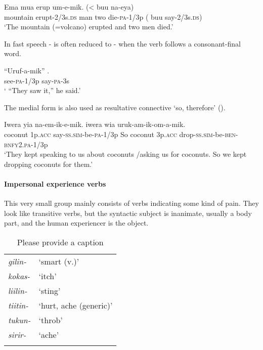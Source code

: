 \ea%
\label{ex:3:x332}
\gll Ema  mua erup um-e-mik. ({{\textless}} buu na-eya) \\
mountain erupt-2/3s.\textsc{ds} man two die-\textsc{pa}-1/3p ( buu say-2/3s.\textsc{ds})\\
\glt`The mountain (=volcano) erupted and two men died.'
\z

In fast speech - is often reduced to - when the verb follows a consonant-final word.

\ea%
\label{ex:3:x333}
\gll ``Uruf-a-mik'' . \\
see-\textsc{pa}-1/3p say-\textsc{pa}-3s \\
\glt` ``They saw it,'' he said.'
\z

The medial form  is also used as resultative connective `so, therefore' ().

\ea%
\label{ex:3:x500}
\gll Iwera yia na-em-ik-e-mik.  iwera wia uruk-am-ik-om-a-mik. \\
coconut 1p.\textsc{acc} say-\textsc{ss}.\textsc{sim}-be-\textsc{pa}-1/3p So coconut 3p.\textsc{acc} drop-\textsc{ss}.\textsc{sim}-be-\textsc{ben}-\textsc{bnfy}2.\textsc{pa}-1/3p\\
\glt`They kept speaking to us about coconuts /asking us for coconuts. So we kept dropping coconuts for them.'
\z

\paragraph{Impersonal experience verbs}\label{sec:3.8.4.4.7}
{}
This very small group mainly consists of verbs indicating some kind of pain. They look like transitive verbs, but the syntactic subject is inanimate, usually a body part, and the human experiencer is the object. 

\begin{table}
\caption{Please provide a caption}
\label{} 
\begin{tabular}{>{\itshape}ll}
\mytoprule
gilin- &`smart (v.)'\\
kokas- &`itch'\\
liilin- &`sting'\\
tiitin- &`hurt, ache (generic)'\\
tukun- &`throb'\\
sirir- &`ache'\\
\mybottomrule
\end{tabular}

\end{table}

